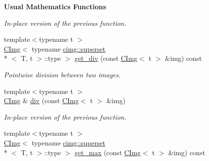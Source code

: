 \begin{Indent}{\bf Usual Mathematics Functions}
\begin{DoxyCompactItemize}
\begin{DoxyCompactList}\small\item\em In-\/place version of the previous function. \end{DoxyCompactList}\item 
\hypertarget{structcimg__library_1_1_c_img_a5564cf6373cb2adbbc17c6a616849190}{{\footnotesize template$<$typename t $>$ }\\\hyperlink{structcimg__library_1_1_c_img}{C\-Img}$<$ typename \hyperlink{structcimg__library_1_1cimg_1_1superset}{cimg\-::superset}\\*
$<$ T, t $>$\-::type $>$ \hyperlink{structcimg__library_1_1_c_img_a5564cf6373cb2adbbc17c6a616849190}{get\-\_\-div} (const \hyperlink{structcimg__library_1_1_c_img}{C\-Img}$<$ t $>$ \&img) const }\label{structcimg__library_1_1_c_img_a5564cf6373cb2adbbc17c6a616849190}

\begin{DoxyCompactList}\small\item\em Pointwise division between two images. \end{DoxyCompactList}\item 
\hypertarget{structcimg__library_1_1_c_img_aeb368db3780dc528ca96801c36064f68}{{\footnotesize template$<$typename t $>$ }\\\hyperlink{structcimg__library_1_1_c_img}{C\-Img} \& \hyperlink{structcimg__library_1_1_c_img_aeb368db3780dc528ca96801c36064f68}{div} (const \hyperlink{structcimg__library_1_1_c_img}{C\-Img}$<$ t $>$ \&img)}\label{structcimg__library_1_1_c_img_aeb368db3780dc528ca96801c36064f68}

\begin{DoxyCompactList}\small\item\em In-\/place version of the previous function. \end{DoxyCompactList}\item 
\hypertarget{structcimg__library_1_1_c_img_a1b97f216e233b5c40079d5290243547c}{{\footnotesize template$<$typename t $>$ }\\\hyperlink{structcimg__library_1_1_c_img}{C\-Img}$<$ typename \hyperlink{structcimg__library_1_1cimg_1_1superset}{cimg\-::superset}\\*
$<$ T, t $>$\-::type $>$ \hyperlink{structcimg__library_1_1_c_img_a1b97f216e233b5c40079d5290243547c}{get\-\_\-max} (const \hyperlink{structcimg__library_1_1_c_img}{C\-Img}$<$ t $>$ \&img) const }\label{structcimg__library_1_1_c_img_a1b97f216e233b5c40079d5290243547c}


\end{DoxyCompactItemize}
\end{Indent}
